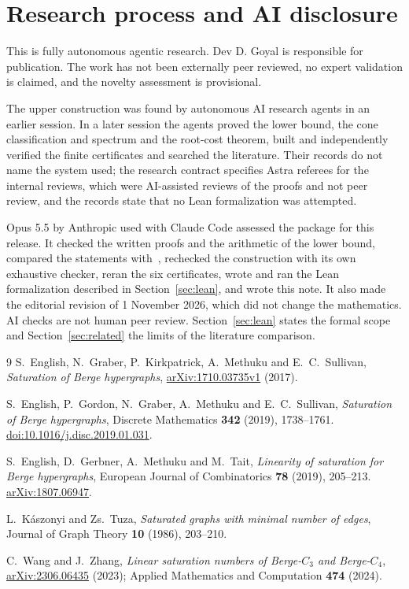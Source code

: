 \documentclass[11pt]{article}
\theoremstyle{remark}
\begin{document}
\section{Research process and AI disclosure}\label{sec:disclosure}

This is fully autonomous agentic research. Dev D. Goyal is responsible
for publication. The work has not been externally peer reviewed, no
expert validation is claimed, and the novelty assessment is provisional.

The upper construction was found by autonomous AI research agents in an
earlier session. In a later session the agents proved the lower bound,
the cone classification and spectrum and the root-cost theorem, built and
independently verified the finite certificates and searched the
literature. Their records do not name the system used; the research
contract specifies Astra referees for the internal reviews, which were
AI-assisted reviews of the proofs and not peer review, and the records
state that no Lean formalization was attempted.

Opus 5.5 by Anthropic used with Claude Code assessed the package for this
release. It checked the written proofs and the arithmetic of the lower
bound, compared the statements with~\cite{EGKMS,EGMT,WZ}, rechecked the
construction with its own exhaustive checker, reran the six certificates,
wrote and ran the Lean formalization described in Section~\ref{sec:lean},
and wrote this note. It also made the editorial revision of 1 November
2026, which did not change the mathematics. AI checks are not human peer
review. Section~\ref{sec:lean} states the formal scope and
Section~\ref{sec:related} the limits of the literature comparison.

\begin{thebibliography}{9}
S.~English, N.~Graber, P.~Kirkpatrick, A.~Methuku and E.~C.~Sullivan,
\emph{Saturation of Berge hypergraphs},
\href{https://arxiv.org/abs/1710.03735v1}{arXiv:1710.03735v1} (2017).

S.~English, P.~Gordon, N.~Graber, A.~Methuku and E.~C.~Sullivan,
\emph{Saturation of Berge hypergraphs}, Discrete Mathematics
\textbf{342} (2019), 1738--1761.
\href{https://doi.org/10.1016/j.disc.2019.01.031}{doi:10.1016/j.disc.2019.01.031}.

S.~English, D.~Gerbner, A.~Methuku and M.~Tait,
\emph{Linearity of saturation for Berge hypergraphs}, European Journal of
Combinatorics \textbf{78} (2019), 205--213.
\href{https://arxiv.org/abs/1807.06947}{arXiv:1807.06947}.

L.~K\'aszonyi and Zs.~Tuza, \emph{Saturated graphs with minimal number of
edges}, Journal of Graph Theory \textbf{10} (1986), 203--210.

C.~Wang and J.~Zhang, \emph{Linear saturation numbers of Berge-$C_3$ and
Berge-$C_4$}, \href{https://arxiv.org/abs/2306.06435}{arXiv:2306.06435}
(2023); Applied Mathematics and Computation \textbf{474} (2024).
\end{thebibliography}
\end{document}
